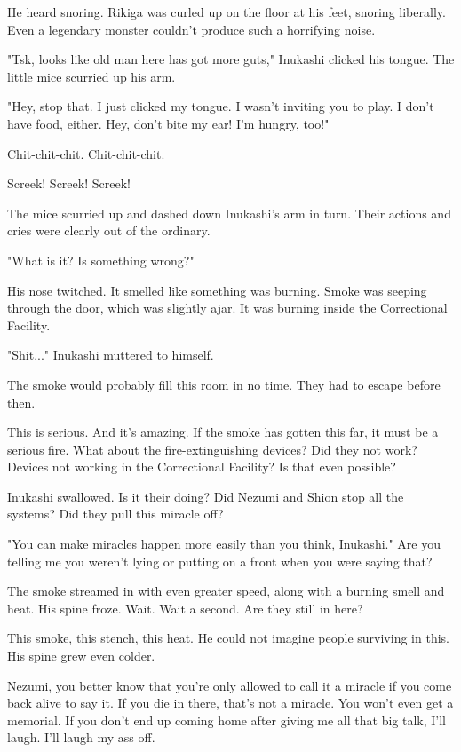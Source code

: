 He heard snoring. Rikiga was curled up on the floor at his feet, snoring
liberally. Even a legendary monster couldn't produce such a horrifying
noise.

"Tsk, looks like old man here has got more guts," Inukashi clicked his
tongue. The little mice scurried up his arm.

"Hey, stop that. I just clicked my tongue. I wasn't inviting you to
play. I don't have food, either. Hey, don't bite my ear! I'm hungry,
too!"

Chit-chit-chit. Chit-chit-chit.

Screek! Screek! Screek!

The mice scurried up and dashed down Inukashi's arm in turn. Their
actions and cries were clearly out of the ordinary.

"What is it? Is something wrong?"

His nose twitched. It smelled like something was burning. Smoke was
seeping through the door, which was slightly ajar. It was burning inside
the Correctional Facility.

"Shit..." Inukashi muttered to himself.

The smoke would probably fill this room in no time. They had to escape
before then.

This is serious. And it's amazing. If the smoke has gotten this far, it
must be a serious fire. What about the fire-extinguishing devices? Did
they not work? Devices not working in the Correctional Facility? Is that
even possible?

Inukashi swallowed. Is it their doing? Did Nezumi and Shion stop all the
systems? Did they pull this miracle off?

"You can make miracles happen more easily than you think, Inukashi." Are
you telling me you weren't lying or putting on a front when you were
saying that?

The smoke streamed in with even greater speed, along with a burning
smell and heat. His spine froze. Wait. Wait a second. Are they still in
here?

This smoke, this stench, this heat. He could not imagine people
surviving in this. His spine grew even colder.

Nezumi, you better know that you're only allowed to call it a miracle if
you come back alive to say it. If you die in there, that's not a
miracle. You won't even get a memorial. If you don't end up coming home
after giving me all that big talk, I'll laugh. I'll laugh my ass off.

